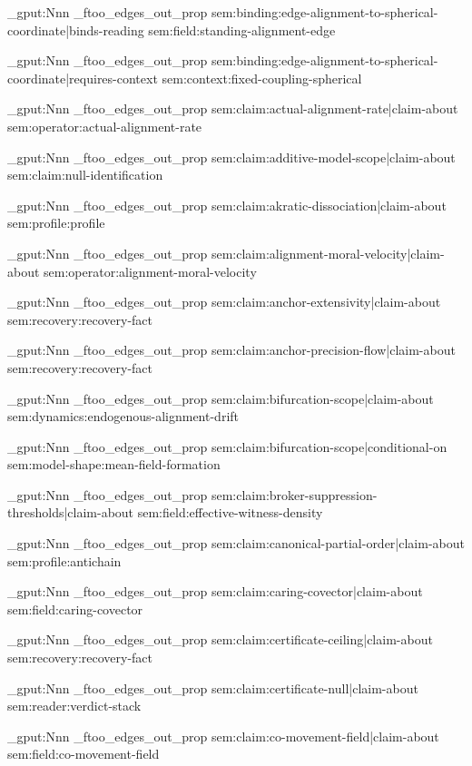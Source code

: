 \prop_gput:Nnn \g_ftoo_edges_out_prop { sem:binding:edge-alignment-to-spherical-coordinate|binds-reading } { sem:field:standing-alignment-edge }

\prop_gput:Nnn \g_ftoo_edges_out_prop { sem:binding:edge-alignment-to-spherical-coordinate|requires-context } { sem:context:fixed-coupling-spherical }

\prop_gput:Nnn \g_ftoo_edges_out_prop { sem:claim:actual-alignment-rate|claim-about } { sem:operator:actual-alignment-rate }

\prop_gput:Nnn \g_ftoo_edges_out_prop { sem:claim:additive-model-scope|claim-about } { sem:claim:null-identification }

\prop_gput:Nnn \g_ftoo_edges_out_prop { sem:claim:akratic-dissociation|claim-about } { sem:profile:profile }

\prop_gput:Nnn \g_ftoo_edges_out_prop { sem:claim:alignment-moral-velocity|claim-about } { sem:operator:alignment-moral-velocity }

\prop_gput:Nnn \g_ftoo_edges_out_prop { sem:claim:anchor-extensivity|claim-about } { sem:recovery:recovery-fact }

\prop_gput:Nnn \g_ftoo_edges_out_prop { sem:claim:anchor-precision-flow|claim-about } { sem:recovery:recovery-fact }

\prop_gput:Nnn \g_ftoo_edges_out_prop { sem:claim:bifurcation-scope|claim-about } { sem:dynamics:endogenous-alignment-drift }

\prop_gput:Nnn \g_ftoo_edges_out_prop { sem:claim:bifurcation-scope|conditional-on } { sem:model-shape:mean-field-formation }

\prop_gput:Nnn \g_ftoo_edges_out_prop { sem:claim:broker-suppression-thresholds|claim-about } { sem:field:effective-witness-density }

\prop_gput:Nnn \g_ftoo_edges_out_prop { sem:claim:canonical-partial-order|claim-about } { sem:profile:antichain }

\prop_gput:Nnn \g_ftoo_edges_out_prop { sem:claim:caring-covector|claim-about } { sem:field:caring-covector }

\prop_gput:Nnn \g_ftoo_edges_out_prop { sem:claim:certificate-ceiling|claim-about } { sem:recovery:recovery-fact }

\prop_gput:Nnn \g_ftoo_edges_out_prop { sem:claim:certificate-null|claim-about } { sem:reader:verdict-stack }

\prop_gput:Nnn \g_ftoo_edges_out_prop { sem:claim:co-movement-field|claim-about } { sem:field:co-movement-field }

